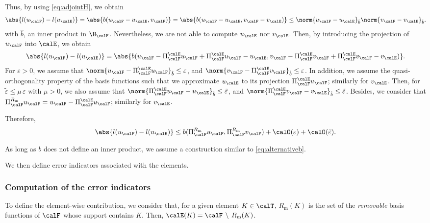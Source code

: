 \noindent Thus, by using \cref{eq:adjointH}, we obtain
\begin{equation}
  \label{eq:errQoi}
  \abs{l(u_{\calF}) - l(u_{\calE})} = \abs{b(u_{\calF} - u_{\calE}, v_{\calF})}= \abs{b(u_{\calF} - u_{\calE}, v_{\calF} - v_{\calE})} \leq \norm{u_{\calF}-u_{\calE}}_{\hat{b}}\norm{v_{\calF}-v_{\calE}}_{\hat{b}}.
\end{equation}
\noindent with $\hat{b}$, an inner product in $\H_{\calF}$. Nevertheless, we are not able to compute $u_{\calE}$ nor $v_{\calE}$. Then, by introducing the projection of $u_{\calF}$ into $\calE$, we obtain
\begin{equation}
  \label{eq:errQoi}
  \abs{l(u_{\calF}) - l(u_{\calE})} = \abs{b(u_{\calF} - \Pi_{\calF}^{\calE} u_{\calF} + \Pi_{\calF}^{\calE} u_{\calF} - u_{\calE}, v_{\calF} - \Pi_{\calF}^{\calE} v_{\calF} + \Pi_{\calF}^{\calE} v_{\calF} - v_{\calE})}.
\end{equation}
\noindent For $\varepsilon > 0$, we assume that $\norm{u_{\calF} - \Pi_{\calF}^{\calE} u_{\calF}}_{\hat{b}} \leq \varepsilon$, and $\norm{v_{\calF} - \Pi_{\calF}^{\calE} v_{\calF}}_{\hat{b}} \leq \varepsilon$. In addition, we assume the quasi-orthogonality property of the basis functions such that we approximate $u_{\calE}$ to its projection $\Pi_{\calF}^{\calE} u_{\calF}$; similarly for $v_{\calE}$. Then, for $\tilde{\varepsilon} \leq \mu \, \varepsilon$ with $\mu > 0$, we also assume that $\norm{\Pi_{\calF}^{\calE} u_{\calF} - u_{\calE}}_{\hat{b}} \leq \tilde{\varepsilon}$, and $\norm{\Pi_{\calF}^{\calE} v_{\calF} - v_{\calE}}_{\hat{b}} \leq \tilde{\varepsilon}$. Besides, we consider that $\Pi_{\calF}^{R_{\textrm{m}}} u_{\calF} = u_{\calF} - \Pi_{\calF}^{\calE} u_{\calF}$; similarly for $v_{\calE}$.

Therefore,
\begin{equation}
  \abs{l(u_{\calF}) - l(u_{\calE})} \leq b(\Pi_{\calF}^{R_{\textrm{m}}} u_{\calF}, \Pi_{\calF}^{R_{\textrm{m}}} v_{\calF}) + \calO(\varepsilon) + \calO(\tilde{\varepsilon}).
\end{equation}

\noindent As long as $b$ does not define an inner product, we assume a construction similar to \cref{eq:alternativeb}.

We then define error indicators associated with the elements.

\subsubsection{Computation of the error indicators}
To define the element-wise contribution, we consider that, for a given element $K \in \calT$, $R_{\textrm{m}}(K)$ is the set of the \emph{removable} basis functions of $\calF$ whose support contains $K$. Then, $\calE(K) = \calF \, \setminus \, R_{\textrm{m}}(K)$.

